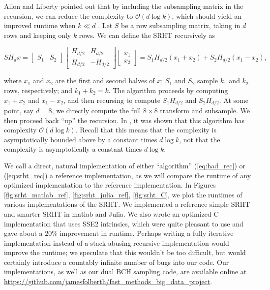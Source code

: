 \documentclass[12pt]{article}
\begin{document}
   Ailon and Liberty pointed out that by including the subsampling matrix in the recursion, we can reduce the complexity to $\mathcal{O}(d\log k)$, which should yield an improved runtime when $k\ll d$ \cite{ailon2009fast}.  Let $S$ be a row subsampling matrix, taking in $d$ rows and keeping only $k$ rows.  We can define the SRHT recursively as 

   \begin{equation}
      \label{eq:srht_rec}
      SH_dx = \begin{bmatrix} S_1 & S_2\end{bmatrix}\begin{bmatrix} H_{d/2} & H_{d/2}\\H_{d/2}&-H_{d/2}\end{bmatrix} \begin{bmatrix}x_1\\x_2\end{bmatrix} = S_1 H_{d/2}(x_1+x_2) + S_2H_{d/2}(x_1-x_2),
   \end{equation}

   \noindent where $x_1$ and $x_2$ are the first and second halves of $x$; $S_1$ and $S_2$ sample $k_1$ and $k_2$ rows, respectively; and $k_1+k_2=k$.  The algorithm proceeds by computing $x_1+x_2$ and $x_1-x_2$, and then recursing to compute $S_1H_{d/2}$ and $S_2H_{d/2}$.  At some point, say $d=8$, we directly compute the full $8\times 8$ transform and subsample.  We then proceed back ``up'' the recursion.  In \cite{ailon2009fast}, it was shown that this algorithm has complexity $\mathcal{O}(d\log k)$.  Recall that this means that the complexity is asymptotically bounded above by a constant times $d\log k$, not that the complexity is asymptotically a constant times $d\log k$.

We call a direct, natural implementation of either ``algorithm'' (\ref{eq:had_rec}) or (\ref{eq:srht_rec}) a reference implementation, as we will compare the runtime of any optimized implementation to the reference implementation.  In Figures \ref{fig:srht_matlab_ref}, \ref{fig:srht_julia_ref}, \ref{fig:srht_C}, we plot the runtimes of various implementations of the SRHT.  We implemented a reference simple SRHT and smarter SRHT in {\sc matlab} and Julia.  We also wrote an optimized C implementation that uses SSE2 intrinsics, which were quite pleasant to use and gave about a $20\%$ improvement in runtime.  Perhaps writing a fully iterative implementation instead of a stack-abusing recursive implementation would improve the runtime; we speculate that this wouldn't be too difficult, but would certainly introduce a countably infinite number of bugs into our code.  Our implementations, as well as our dual BCH sampling code,  are available online at \url{https://github.com/jamesfolberth/fast_methods_big_data_project}.
\end{document}
